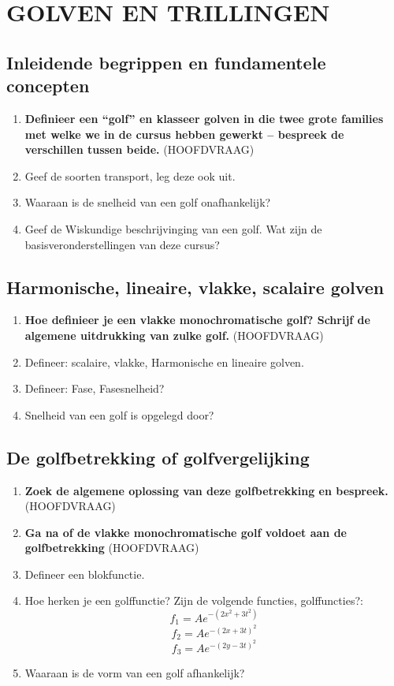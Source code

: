 \documentclass[12pt]{article}
\begin{document}
    \maketitle

    \section{GOLVEN EN TRILLINGEN}
    \subsection{Inleidende begrippen en fundamentele concepten}
    \begin{enumerate}
        \item \textbf{Definieer een “golf” en klasseer golven in die twee grote families met welke we in de cursus hebben gewerkt – bespreek de verschillen tussen beide.} (HOOFDVRAAG)
        \item Geef de soorten transport, leg deze ook uit.
        \item Waaraan is de snelheid van een golf onafhankelijk?
        \item Geef de Wiskundige beschrijvinging van een golf. Wat zijn de basisveronderstellingen van deze cursus?
    \end{enumerate}
    \subsection{Harmonische, lineaire, vlakke, scalaire golven}
    \begin{enumerate}
        \item \textbf{Hoe definieer je een vlakke monochromatische golf? Schrijf de algemene uitdrukking van zulke golf.} (HOOFDVRAAG)
        \item Defineer: scalaire, vlakke, Harmonische en lineaire golven.
        \item Defineer: Fase, Fasesnelheid?
        \item Snelheid van een golf is opgelegd door?
    \end{enumerate}
    \subsection{De golfbetrekking of golfvergelijking}
    \begin{enumerate}
        \item \textbf{Zoek de algemene oplossing van deze golfbetrekking en bespreek. } (HOOFDVRAAG)
        \item \textbf{Ga na of de vlakke monochromatische golf voldoet aan de golfbetrekking} (HOOFDVRAAG)
        \item Defineer een blokfunctie.
        \item Hoe herken je een golffunctie? Zijn de volgende functies, golffuncties?: 
        $$f_1 = Ae^{-(2x^2+3t^2)}$$ 
        $$f_2 = Ae^{-(2x+3t)^2}$$ 
        $$f_3 = Ae^{-(2y-3t)^2}$$
        \item Waaraan is de vorm van een golf afhankelijk?
    \end{enumerate}
\end{document}
